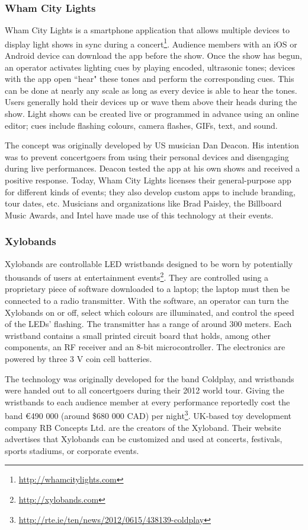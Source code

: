\subsubsection{Wham City Lights}

Wham City Lights is a smartphone application that allows multiple devices to display light shows in sync during a concert\footnote{\url{http://whamcitylights.com}}. Audience members with an iOS or Android device can download the app before the show. Once the show has begun, an operator activates lighting cues by playing encoded, ultrasonic tones; devices with the app open ``hear" these tones and perform the corresponding cues. This can be done at nearly any scale as long as every device is able to hear the tones. Users generally hold their devices up or wave them above their heads during the show. Light shows can be created live or programmed in advance using an online editor; cues include flashing colours, camera flashes, GIFs, text, and sound.

The concept was originally developed by US musician Dan Deacon. His intention was to prevent concertgoers from using their personal devices and disengaging during live performances. Deacon tested the app at his own shows and received a positive response. Today, Wham City Lights licenses their general-purpose app for different kinds of events; they also develop custom apps to include branding, tour dates, etc. Musicians and organizations like Brad Paisley, the Billboard Music Awards, and Intel have made use of this technology at their events.

\subsubsection{Xylobands}

Xylobands are controllable LED wristbands designed to be worn by potentially thousands of users at entertainment events\footnote{\url{http://xylobands.com}}. They are controlled using a proprietary piece of software downloaded to a laptop; the laptop must then be connected to a radio transmitter. With the software, an operator can turn the Xylobands on or off, select which colours are illuminated, and control the speed of the LEDs' flashing. The transmitter has a range of around 300 meters. Each wristband contains a small printed circuit board that holds, among other components, an RF receiver and an 8-bit microcontroller. The electronics are powered by three 3 V coin cell batteries.

The technology was originally developed for the band Coldplay, and wristbands were handed out to all concertgoers during their 2012 world tour. Giving the wristbands to each audience member at every performance reportedly cost the band \euro{}490 000 (around \$680 000 CAD) per night\footnote{\url{http://rte.ie/ten/news/2012/0615/438139-coldplay}}. UK-based toy development company RB Concepts Ltd. are the creators of the Xyloband. Their website advertises that Xylobands can be customized and used at concerts, festivals, sports stadiums, or corporate events.
